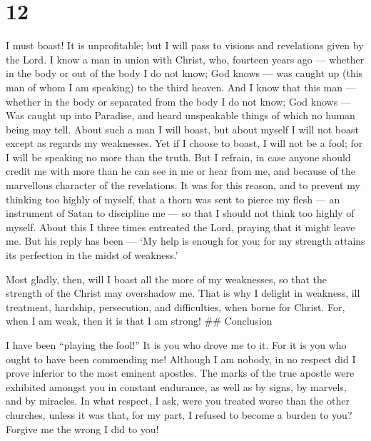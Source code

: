 \hypertarget{section-10}{%
\section{12}\label{section-10}}

 I must boast! It is unprofitable; but I will pass to
visions and revelations given by the Lord.  I know a man in
union with Christ, who, fourteen years ago --- whether in the body or
out of the body I do not know; God knows --- was caught up (this man of
whom I am speaking) to the third heaven.  And I know that
this man --- whether in the body or separated from the body I do not
know; God knows ---  Was caught up into Paradise, and heard
unspeakable things of which no human being may tell.  About
such a man I will boast, but about myself I will not boast except as
regards my weaknesses.  Yet if I choose to boast, I will not
be a fool; for I will be speaking no more than the truth. But I refrain,
in case anyone should credit me with more than he can see in me or hear
from me, and because of the marvellous character of the revelations.
 It was for this reason, and to prevent my thinking too
highly of myself, that a thorn was sent to pierce my flesh --- an
instrument of Satan to discipline me --- so that I should not think too
highly of myself.  About this I three times entreated the
Lord, praying that it might leave me.  But his reply has
been --- `My help is enough for you; for my strength attains its
perfection in the midst of weakness.'

Most gladly, then, will I boast all the more of my weaknesses, so that
the strength of the Christ may overshadow me.  That is why
I delight in weakness, ill treatment, hardship, persecution, and
difficulties, when borne for Christ. For, when I am weak, then it is
that I am strong! \#\# Conclusion

 I have been ``playing the fool!'' It is you who drove me
to it. For it is you who ought to have been commending me! Although I am
nobody, in no respect did I prove inferior to the most eminent apostles.
 The marks of the true apostle were exhibited amongst you
in constant endurance, as well as by signs, by marvels, and by miracles.
 In what respect, I ask, were you treated worse than the
other churches, unless it was that, for my part, I refused to become a
burden to you? Forgive me the wrong I did to you!

